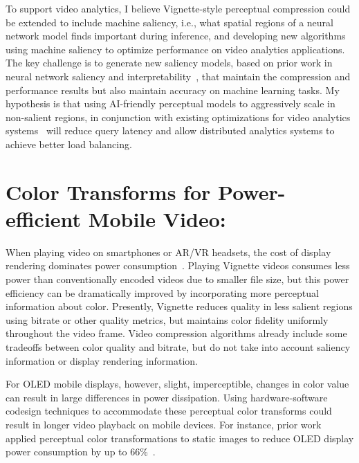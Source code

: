 To support video analytics, I believe Vignette-style perceptual compression could be extended to include machine saliency, i.e., what spatial regions of a neural network model finds important during inference, and developing new algorithms using machine saliency to optimize performance on video analytics applications.
The key challenge is to generate new saliency models, based on prior work in neural network saliency and interpretability~\cite{Simonyan2013DeepIC,Zeiler2014VisualizingAU,Zintgraf2017VisualizingDN}, that maintain the compression and performance results but also maintain accuracy on machine learning tasks.
My hypothesis is that using AI-friendly perceptual models to aggressively scale in non-salient regions, in conjunction with existing optimizations for video analytics systems~\cite{videostorm, chameleon18sigcomm, focus18osdi} will reduce query latency and allow distributed analytics systems to achieve better load balancing.

\section{Color Transforms for Power-efficient Mobile Video:}
\label{sec:chroma-vign}
When playing video on smartphones or AR/VR headsets, the cost of display rendering dominates power consumption~\cite{likamwa-apsys}.
Playing Vignette videos consumes less power than conventionally encoded videos due to smaller file size, but this power efficiency can be dramatically improved by incorporating more perceptual information about color.
Presently, Vignette reduces quality in less salient regions using bitrate or other quality metrics, but maintains color fidelity uniformly throughout the video frame.
Video compression algorithms already include some tradeoffs between color quality and bitrate, but do not take into account saliency information or display rendering information.

For OLED mobile displays, however, slight, imperceptible, changes in color value can result in large differences in power dissipation.
Using hardware-software codesign techniques to accommodate these perceptual color transforms could result in longer video playback on mobile devices.
For instance, prior work applied perceptual color transformations to static images to reduce OLED display power consumption by up to 66\%~\cite{crayon, stanley2018perceived}.

